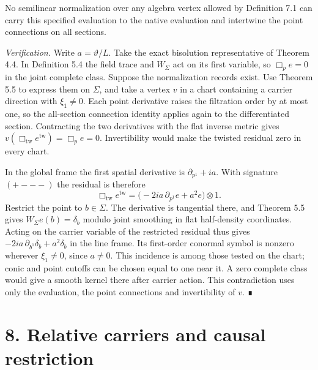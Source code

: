 \documentclass[
  english,
  11pt,
  reqno]{amsart}
\begin{document}
No semilinear normalization over any algebra vertex allowed by
Definition 7.1 can carry this specified evaluation to the native
evaluation and intertwine the point connections on all sections.

\emph{Verification.} Write \(a=\vartheta/L\). Take the exact bisolution
representative of Theorem 4.4. In Definition 5.4 the field trace and
\(W_\Sigma\) act on its first variable, so \(\Box_p e=0\) in the joint
complete class. Suppose the normalization records exist. Use Theorem 5.5
to express them on \(\Sigma\), and take a vertex \(v\) in a chart
containing a carrier direction with \(\xi_1\ne0\). Each point derivative
raises the filtration order by at most one, so the all-section
connection identity applies again to the differentiated section.
Contracting the two derivatives with the flat inverse metric gives
\(v(\Box_{\mathrm{tw}}e^{\mathrm{tw}})=\Box_p e=0\). Invertibility would
make the twisted residual zero in every chart.

In the global frame the first spatial derivative is
\(\partial_{p^1}+ia\). With signature \((+---)\) the residual is
therefore \[
\Box_{\mathrm{tw}}e^{\mathrm{tw}}
=\bigl(-2ia\,\partial_{p^1}e+a^2e\bigr)\otimes1.
\] Restrict the point to \(b\in\Sigma\). The derivative is tangential
there, and Theorem 5.5 gives \(W_\Sigma e(b)=\delta_b\) modulo joint
smoothing in flat half-density coordinates. Acting on the carrier
variable of the restricted residual thus gives
\(-2ia\,\partial_{b^1}\delta_b+a^2\delta_b\) in the line frame. Its
first-order conormal symbol is nonzero wherever \(\xi_1\ne0\), since
\(a\ne0\). This incidence is among those tested on the chart; conic and
point cutoffs can be chosen equal to one near it. A zero complete class
would give a smooth kernel there after carrier action. This
contradiction uses only the evaluation, the point connections and
invertibility of \(v\). ∎

\protect{}\label{sec:relative-carrier-restriction}

\section{8. Relative carriers and causal
restriction}\label{relative-carriers-and-causal-restriction}
\end{document}
